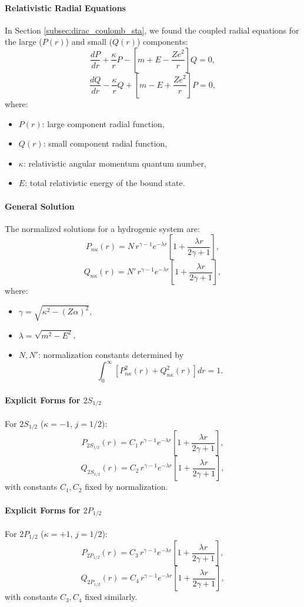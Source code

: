 \documentclass[12pt]{article}
\begin{document}
\paragraph{Relativistic Radial Equations}
In Section \ref{subsec:dirac_coulomb_sta}, we found the coupled radial equations for the large (\(P(r)\)) and small (\(Q(r)\)) components:
\[
\frac{dP}{dr} + \frac{\kappa}{r}P - \left[m + E - \frac{Ze^2}{r}\right]Q = 0,
\]
\[
\frac{dQ}{dr} - \frac{\kappa}{r}Q + \left[m - E + \frac{Ze^2}{r}\right]P = 0,
\]
where:
\begin{itemize}
    \item \(P(r)\): large component radial function,
    \item \(Q(r)\): small component radial function,
    \item \(\kappa\): relativistic angular momentum quantum number,
    \item \(E\): total relativistic energy of the bound state.
\end{itemize}

\paragraph{General Solution}
The normalized solutions for a hydrogenic system are:
\[
P_{n\kappa}(r) = N\,r^{\gamma-1}e^{-\lambda r}\left[1+\frac{\lambda r}{2\gamma+1}\right],
\]
\[
Q_{n\kappa}(r) = N'\,r^{\gamma-1}e^{-\lambda r}\left[1+\frac{\lambda r}{2\gamma+1}\right],
\]
where:
\begin{itemize}
    \item \(\gamma = \sqrt{\kappa^2-(Z\alpha)^2}\),
    \item \(\lambda = \sqrt{m^2-E^2}\),
    \item \(N, N'\): normalization constants determined by
    \[
    \int_0^\infty \left[P_{n\kappa}^2(r)+Q_{n\kappa}^2(r)\right]dr=1.
    \]
\end{itemize}

\paragraph{Explicit Forms for \(2S_{1/2}\)}
For \(2S_{1/2}\) (\(\kappa = -1\), \(j=1/2\)):
\[
P_{2S_{1/2}}(r) = C_1\,r^{\gamma-1}e^{-\lambda r}\left[1+\frac{\lambda r}{2\gamma+1}\right],
\]
\[
Q_{2S_{1/2}}(r) = C_2\,r^{\gamma-1}e^{-\lambda r}\left[1+\frac{\lambda r}{2\gamma+1}\right],
\]
with constants \(C_1,C_2\) fixed by normalization.

\paragraph{Explicit Forms for \(2P_{1/2}\)}
For \(2P_{1/2}\) (\(\kappa = +1\), \(j=1/2\)):
\[
P_{2P_{1/2}}(r) = C_3\,r^{\gamma-1}e^{-\lambda r}\left[1+\frac{\lambda r}{2\gamma+1}\right],
\]
\[
Q_{2P_{1/2}}(r) = C_4\,r^{\gamma-1}e^{-\lambda r}\left[1+\frac{\lambda r}{2\gamma+1}\right],
\]
with constants \(C_3,C_4\) fixed similarly.
\end{document}
